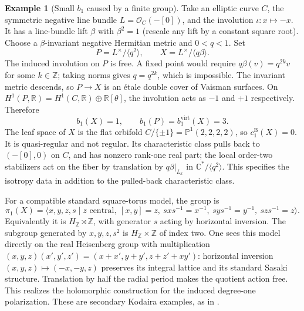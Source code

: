 \documentclass[12pt]{amsart}
\theoremstyle{definition}
\newtheorem{eg}[thm]{Example}
\theoremstyle{remark}
\numberwithin{equation}{section}
\newcommand{\cO}{\mathcal{O}}
\newcommand{\R}{\mathbb{R}}
\newcommand{\Z}{\mathbb{Z}}
\newcommand{\C}{\mathbb{C}}
\newcommand{\mP}{\mathbb{P}}
\newcommand{\bas}{\mathrm{B}}
\newcommand{\virt}{\mathrm{virt}}
\begin{document}
\begin{eg}[Small $b_1$ caused by a finite group]\label{eg:secondary}
Take an elliptic curve $C$, the symmetric negative line bundle
$L=\cO_C(-[0])$, and the involution $\iota:x\mapsto-x$.
It has a line-bundle lift $\beta$ with $\beta^2=1$ (rescale any lift
by a constant square root). Choose a $\beta$-invariant negative
Hermitian metric and $0<q<1$. Set
\begin{equation}\label{eq:secondary}
P=L^{\times}/\langle q^2\rangle,
\qquad X=L^{\times}/\langle q\beta\rangle.
\end{equation}
The induced involution on $P$ is free. A fixed point would require
$q\beta(v)=q^{2k}v$ for some $k\in\Z$; taking norms gives
$q=q^{2k}$, which is impossible. The invariant metric descends, so
$P\to X$ is an \'etale double cover of Vaisman surfaces. On
$H^1(P,\R)=H^1(C,\R)\oplus\R[\theta]$, the involution acts as
$-1$ and $+1$ respectively. Therefore
\begin{equation}\label{eq:secondarynumbers}
b_1(X)=1,\qquad b_1(P)=b_1^{\virt}(X)=3.
\end{equation}
The leaf space of $X$ is the flat orbifold
$C/\{\pm1\}=\mP^1(2,2,2,2)$, so $c_1^{\bas}(X)=0$.
It is quasi-regular and not regular. Its characteristic class pulls
back to $(-[0],0)$ on $C$, and has nonzero rank-one real part;
the local order-two stabilizers act on the fiber by translation by
$q\beta|_{L_x}$ in $\C^*/\langle q^2\rangle$. This specifies the
isotropy data in addition to the pulled-back characteristic class.

For a compatible standard square-torus model, the group is
\[
\pi_1(X)=\langle x,y,z,s\mid z\text{ central},\ [x,y]=z,
\ sxs^{-1}=x^{-1},\ sys^{-1}=y^{-1},\ szs^{-1}=z\rangle.
\]
Equivalently it is $H_{\Z}\rtimes\Z$, with generator $s$ acting by
horizontal inversion. The subgroup generated by $x,y,z,s^2$ is
$H_{\Z}\times\Z$ of index two. One sees this model directly on the
real Heisenberg group with multiplication
$(x,y,z)(x',y',z')=(x+x',y+y',z+z'+xy')$: horizontal inversion
$(x,y,z)\mapsto(-x,-y,z)$ preserves its integral lattice and its
standard Sasaki structure. Translation by half the radial period makes
the quotient action free. This realizes the holomorphic construction
for the induced degree-one polarization. These are secondary Kodaira
examples, as in \cite[Example 7.3]{Istrati}.
\end{eg}
\end{document}
